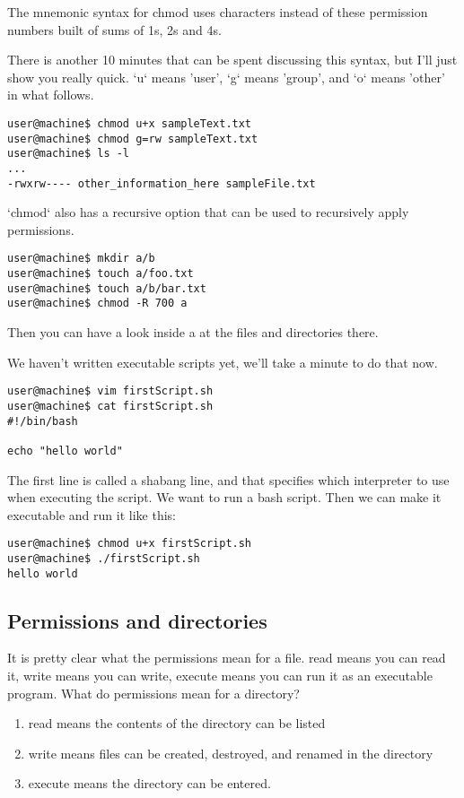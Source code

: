 \documentclass[10pt]{article}
\begin{document}
The mnemonic syntax for chmod uses characters instead of these permission numbers built of sums of 1s, 2s and 4s.

There is another 10 minutes that can be spent discussing this syntax, but I'll  just show you really quick. `u` means 'user', `g` means 'group', and `o` means 'other' in what follows.

\begin{lstlisting}[style=term]
user@machine$ chmod u+x sampleText.txt
user@machine$ chmod g=rw sampleText.txt
user@machine$ ls -l
...
-rwxrw---- other_information_here sampleFile.txt
\end{lstlisting}

`chmod` also has a recursive option that can be used to recursively apply permissions.

\begin{lstlisting}[style=term]
user@machine$ mkdir a/b
user@machine$ touch a/foo.txt
user@machine$ touch a/b/bar.txt
user@machine$ chmod -R 700 a
\end{lstlisting}

Then you can have a look inside a at the files and directories there.

We haven't written executable scripts yet, we'll take a minute to do that now.

\begin{lstlisting}[style=term]
user@machine$ vim firstScript.sh
user@machine$ cat firstScript.sh
#!/bin/bash

echo "hello world"
\end{lstlisting}

The first line is called a shabang line, and that specifies which interpreter to use when executing the script. We want to run a bash script.
Then we can make it executable and run it like this:

\begin{lstlisting}[style=term]
user@machine$ chmod u+x firstScript.sh
user@machine$ ./firstScript.sh
hello world
\end{lstlisting}

\subsection{ Permissions and directories }
It is pretty clear what the permissions mean for a file. read means you can read it, write means you can write, execute means you can run it as an executable program. What do permissions mean for a directory?

\begin{enumerate}
\item read means the contents of the directory can be listed
\item write means files can be created, destroyed, and renamed in the directory
\item execute means the directory can be entered.
\end{enumerate}
\end{document}
